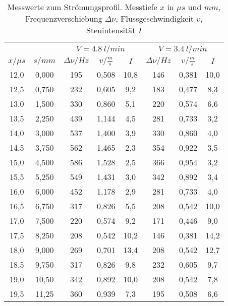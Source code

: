 \begin{table}[h!]
  \centering
  \caption{Messwerte zum Strömungsprofil. Messtiefe $x$ in $\mu s$ und $mm$, Frequenzverschiebung $\Delta \nu$, Flussgeschwindigkeit $v$, Steuintensität $I$}
  \label{tab:profil}
  \begin{tabular}{c c c c c c c c}
    \toprule
                &         & \multicolumn{3}{c}{$\dot{V}=\SI{4,8}{l/min}$} & \multicolumn{3}{c}{$\dot{V}=\SI{3,4}{l/min}$} \\
      $x/\mu s$ & $s/mm$  &  $\Delta \nu / Hz$ & $v/\frac{m}{s}$ & $I$ &  $\Delta \nu / Hz$ & $v/\frac{m}{s}$ & $I$    \\
      \midrule
      12,0      & 0,000   &   195  &  0,508  &  10,8   & 146   &   0,381  &  10,0 \\
      12,5      & 0,750  &   232  &  0,605  &   9,2   & 183   &   0,477  &   8,3 \\
      13,0      & 1,500  &   330  &  0,860  &   5,1   & 220   &   0,574  &   6,6 \\
      13,5      & 2,250  &   439  &  1,144  &   4,5   & 281   &   0,733  &   3,2 \\
      14,0      & 3,000  &   537  &  1,400  &   3,9   & 330   &   0,860  &   4,0 \\
      14,5      & 3,750  &   562  &  1,465  &   2,3   & 354   &   0,922  &   3,5 \\
      15,0      & 4,500  &   586  &  1,528  &   2,5   & 366   &   0,954  &   3,2 \\
      15,5      & 5,250  &   549  &  1,431  &   3,0   & 342   &   0,892  &   3,4 \\
      16,0      & 6,000  &   452  &  1,178  &   2,9   & 281   &   0,733  &   4,0 \\
      16,5      & 6,750  &   317  &  0,826  &   5,5   & 208   &   0,542  &  10,0 \\
      17,0      & 7,500  &   220  &  0,574  &   9,2   & 171   &   0,446  &   9,0 \\
      17,5      & 8,250  &   208  &  0,542  &  10,2   & 146   &   0,381  &  14,2 \\
      18,0      & 9,000  &   269  &  0,701  &  13,4   & 208   &   0,542  &  12,7 \\
      18,5      & 9,750  &   317  &  0,826  &   9,8   & 232   &   0,605  &   9,7 \\
      19,0      & 10,50  &   342  &  0,892  &  10,0   & 208   &   0,542  &   7,8 \\
      19,5      & 11,25  &   360  &  0,939  &   7,3   & 195   &   0,508  &   6,6 \\

    \bottomrule
  \end{tabular}
\end{table}

%
